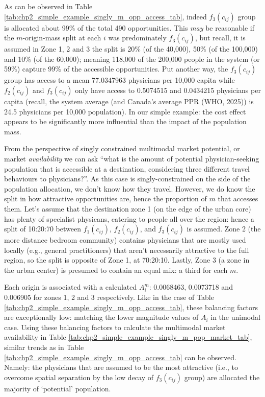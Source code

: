 \documentclass[
11pt, %
oneside, %
english, %
singlespacing, %
]{macthesis} %
\begin{document}


As can be observed in Table \ref{tab:chp2_simple_example_singly_m_opp_access_tab}, indeed \(f_3(c_{ij})\) group is allocated about 99\% of the total 490 opportunities. This \emph{may} be reasonable if the \(m\)-origin-mass split at each \(i\) was predominately \(f_3(c_{ij})\), but recall, it is assumed in Zone 1, 2 and 3 the split is 20\% (of the 40,000), 50\% (of the 100,000) and 10\% (of the 60,000); meaning 118,000 of the 200,000 people in the system (or 59\%) capture 99\% of the accessible opportunities. Put another way, the \(f_3(c_{ij})\) group has access to a mean 77.0347963 physicians per 10,000 capita while \(f_2(c_{ij})\) and \(f_3(c_{ij})\) only have access to 0.5074515 and 0.0434215 physicians per capita (recall, the system average (and Canada's average PPR (WHO, 2025)) is 24.5 physicians per 10,000 population). In our simple example: the cost effect appears to be significantly more influential than the impact of the population mass.

From the perspective of singly constrained multimodal market potential, or market \emph{availability} we can ask ``what is the amount of potential physician-seeking population that is accessible at a destination, considering three different travel behaviours to physicians?''. As this case is singly-constrained on the side of the population allocation, we don't know how they travel. However, we do know the split in how attractive opportunities are, hence the proportion of \(m\) that accesses them. Let's assume that the destination zone 1 (on the edge of the urban core) has plenty of specialist physicans, catering to people all over the region: hence a split of 10:20:70 between \(f_1(c_{ij})\), \(f_2(c_{ij})\), and \(f_3(c_{ij})\) is assumed. Zone 2 (the more distance bedroom community) contains physicians that are mostly used locally (e.g., general practitioners) that aren't necessarily attractive to the full region, so the split is opposite of Zone 1, at 70:20:10. Lastly, Zone 3 (a zone in the urban center) is presumed to contain an equal mix: a third for each \(m\).

Each origin is associated with a calculated \(A_i^m\): 0.0068463, 0.0073718 and 0.006905 for zones 1, 2 and 3 respectively. Like in the case of Table \ref{tab:chp2_simple_example_singly_m_opp_access_tab}, these balancing factors are exceptionally low: matching the lower magnitude values of \(A_i\) in the unimodal case. Using these balancing factors to calculate the multimodal market availability in Table \ref{tab:chp2_simple_example_singly_m_pop_market_tab}, similar trends as in Table \ref{tab:chp2_simple_example_singly_m_opp_access_tab} can be observed. Namely: the physicians that are assumed to be the most attractive (i.e., to overcome spatial separation by the low decay of \(f_3(c_{ij})\) group) are allocated the majority of `potential' population.
\end{document}
